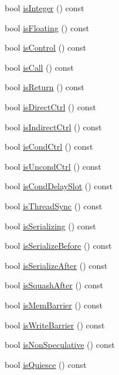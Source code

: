 \begin{DoxyCompactItemize}
bool \hyperlink{classBaseDynInst_a06625615adfaf28305767ac42b1ef0a4}{isInteger} () const 
\item 
bool \hyperlink{classBaseDynInst_a58024ee3f69c53c47ec5b315b78a7302}{isFloating} () const 
\item 
bool \hyperlink{classBaseDynInst_a2ff117edfab9c8486802c441ac331086}{isControl} () const 
\item 
bool \hyperlink{classBaseDynInst_aa2317a020504e552097abb001847f74c}{isCall} () const 
\item 
bool \hyperlink{classBaseDynInst_a56f87bc75115f1dcea77803b01f40d2c}{isReturn} () const 
\item 
bool \hyperlink{classBaseDynInst_ac218ba4230a8cd92999948288a54e14f}{isDirectCtrl} () const 
\item 
bool \hyperlink{classBaseDynInst_a5dfa427a48589c4c910416a67808510f}{isIndirectCtrl} () const 
\item 
bool \hyperlink{classBaseDynInst_a941920262acf4437e241c7600b3007ff}{isCondCtrl} () const 
\item 
bool \hyperlink{classBaseDynInst_af53002b2f11733681e8552aa6805a706}{isUncondCtrl} () const 
\item 
bool \hyperlink{classBaseDynInst_a50a12c82ee75e53f92c0852ae3ea71e8}{isCondDelaySlot} () const 
\item 
bool \hyperlink{classBaseDynInst_ae1376a5b7bbe66f8bcf8b3517802c85f}{isThreadSync} () const 
\item 
bool \hyperlink{classBaseDynInst_a0b876c794e1ed62f664670215da8793f}{isSerializing} () const 
\item 
bool \hyperlink{classBaseDynInst_aa350b74ea660b6821bd37cd139bd917b}{isSerializeBefore} () const 
\item 
bool \hyperlink{classBaseDynInst_a4d1c24871e03e495a1841ea16d11a68f}{isSerializeAfter} () const 
\item 
bool \hyperlink{classBaseDynInst_a11c92e1c9e4b69f9cb64a9794f1fef4c}{isSquashAfter} () const 
\item 
bool \hyperlink{classBaseDynInst_a8bcffaf6f3c61001c56f6199a3221221}{isMemBarrier} () const 
\item 
bool \hyperlink{classBaseDynInst_aadc753a9e3a0d5bb33b6551fb3ad5f7e}{isWriteBarrier} () const 
\item 
bool \hyperlink{classBaseDynInst_af032774c8da8aea2d9d84d5f3f211a7f}{isNonSpeculative} () const 
\item 
bool \hyperlink{classBaseDynInst_adc9467e7b34e8dff3964c85b66bb1b93}{isQuiesce} () const 
\item 

\end{DoxyCompactItemize}
